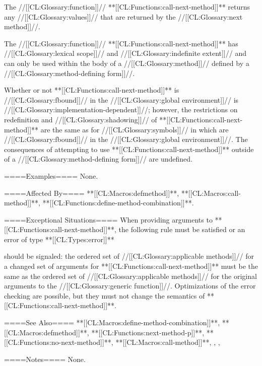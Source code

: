 The //[[CL:Glossary:function]]// **[[CL:Functions:call-next-method]]** returns any //[[CL:Glossary:values]]// that are returned by the //[[CL:Glossary:next method]]//.

The //[[CL:Glossary:function]]// **[[CL:Functions:call-next-method]]** has //[[CL:Glossary:lexical scope]]// and //[[CL:Glossary:indefinite extent]]// and can only be used within the body of a //[[CL:Glossary:method]]// defined by a //[[CL:Glossary:method-defining form]]//.

Whether or not **[[CL:Functions:call-next-method]]** is //[[CL:Glossary:fbound]]// in the //[[CL:Glossary:global environment]]// is //[[CL:Glossary:implementation-dependent]]//; however, the restrictions on redefinition and //[[CL:Glossary:shadowing]]// of **[[CL:Functions:call-next-method]]** are the same as for //[[CL:Glossary:symbols]]// in  which are //[[CL:Glossary:fbound]]// in the //[[CL:Glossary:global environment]]//. The consequences of attempting to use **[[CL:Functions:call-next-method]]** outside of a //[[CL:Glossary:method-defining form]]// are undefined.

====Examples====
None.

====Affected By====
**[[CL:Macros:defmethod]]**, **[[CL:Macros:call-method]]**, **[[CL:Functions:define-method-combination]]**.

====Exceptional Situations====
When providing arguments to **[[CL:Functions:call-next-method]]**, the following rule must be satisfied or an error of type **[[CL:Types:error]]**

should be signaled: the ordered set of //[[CL:Glossary:applicable methods]]// for a changed set of arguments for **[[CL:Functions:call-next-method]]** must be the same as the ordered set of //[[CL:Glossary:applicable methods]]// for the original arguments to the //[[CL:Glossary:generic function]]//. Optimizations of the error checking are possible, but they must not change the semantics of **[[CL:Functions:call-next-method]]**.

====See Also====
**[[CL:Macros:define-method-combination]]**, **[[CL:Macros:defmethod]]**, **[[CL:Functions:next-method-p]]**, **[[CL:Functions:no-next-method]]**, **[[CL:Macros:call-method]]**, {\secref\MethodSelectionAndCombination}, {\secref\StdMethComb}, {\secref\BuiltInMethCombTypes}

====Notes====
None.

 
